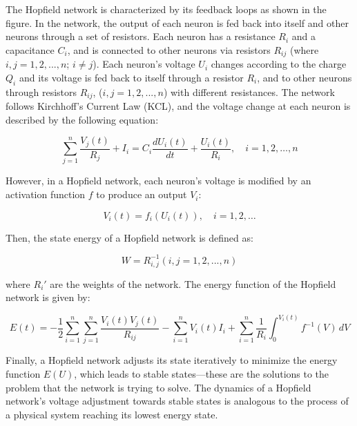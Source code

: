 \documentclass[12pt,a4paper]{report}
\begin{document}
The Hopfield network is characterized by its feedback loops as shown in the figure. In the network, the output of each neuron is fed back into itself and other neurons through a set of resistors. Each neuron has a resistance \( R_i \) and a capacitance \( C_i \), and is connected to other neurons via resistors \( R_{ij} \) (where \( i,j = 1,2,...,n \); \( i \neq j \)). Each neuron's voltage \( U_i \) changes according to the charge \( Q_i \) and its voltage is fed back to itself through a resistor \( R_i \), and to other neurons through resistors \( R_{ij} \), (\( i,j = 1,2,...,n \)) with different resistances. The network follows Kirchhoff's Current Law (KCL), and the voltage change at each neuron is described by the following equation:

\begin{equation}
    \sum_{j=1}^{n} \frac{V_j(t)}{R_j} + I_i = C_i \frac{dU_i(t)}{dt} + \frac{U_i(t)}{R_i}, \quad i = 1, 2, \ldots, n
\end{equation}

However, in a Hopfield network, each neuron's voltage is modified by an activation function \( f \) to produce an output \( V_i \):

\begin{equation}
    V_i(t) = f_i(U_i(t)), \quad i = 1, 2, \ldots
\end{equation}

Then, the state energy of a Hopfield network is defined as:

\begin{equation}
W = R_{i,j}^{-1} (i,j=1,2,...,n)
\end{equation}

where \( R_i' \) are the weights of the network. The energy function of the Hopfield network is given by:

\begin{equation}
    E(t) = -\frac{1}{2} \sum_{i=1}^{n} \sum_{j=1}^{n} \frac{V_i(t)V_j(t)}{R_{ij}} - \sum_{i=1}^{n} V_i(t)I_i + \sum_{i=1}^{n} \frac{1}{R_i} \int_{0}^{V_i(t)} f^{-1}(V) \, dV
\end{equation}

Finally, a Hopfield network adjusts its state iteratively to minimize the energy function \( E(U) \), which leads to stable states—these are the solutions to the problem that the network is trying to solve. The dynamics of a Hopfield network's voltage adjustment towards stable states is analogous to the process of a physical system reaching its lowest energy state.
\end{document}
